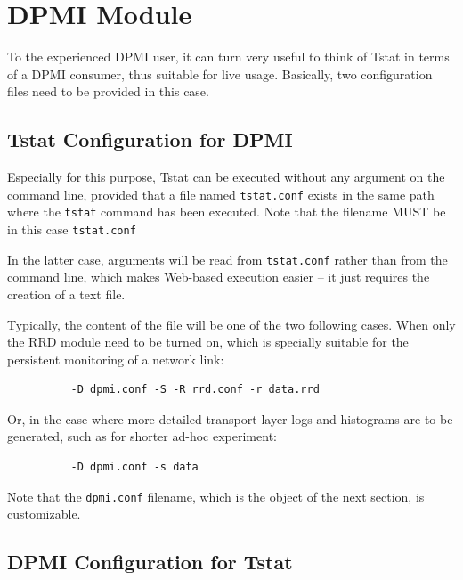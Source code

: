 \documentclass[11pt]{article}
\begin{document}
\section{DPMI Module\label{DPMI_Module}}


To the experienced DPMI user, it can turn very useful to
think of Tstat in terms of a DPMI consumer, thus suitable
for live usage. Basically, two configuration files need to 
be provided in this case.

\subsection{Tstat Configuration for DPMI\label{Tstat_Configuration_for_DPMI}}


Especially for this purpose,  Tstat can be executed without any argument
on the command line, provided that a file named \texttt{tstat.conf} 
exists in the same path where the \texttt{tstat} command has been
executed. Note that the filename MUST be in this case \texttt{tstat.conf}



In the latter case, arguments will be read from 
\texttt{tstat.conf} rather than from the command line, which makes
Web-based execution easier -- it just requires the creation of
a text file.



Typically, the content of the file will be one of the two following
cases. When only the RRD module need to be turned on, which is 
specially suitable for the persistent monitoring of a network link:

\begin{small}\begin{verbatim}
          -D dpmi.conf -S -R rrd.conf -r data.rrd
\end{verbatim}\end{small} \noindent
Or, in the case where more detailed transport layer logs and histograms 
are to be generated, such as for shorter ad-hoc experiment:

\begin{small}\begin{verbatim}
          -D dpmi.conf -s data
\end{verbatim}\end{small} \noindent
Note that the \texttt{dpmi.conf} filename, which is the object of the next 
section, is customizable.

\subsection{DPMI Configuration for Tstat\label{DPMI_Configuration_for_Tstat}}
\end{document}
